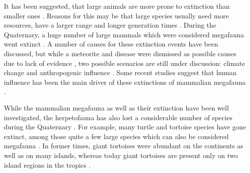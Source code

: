 It has been suggested, that large animals are more prone to extinction than smaller ones \citep{.}. Reasons for this may be that large species usually need more resources, have a larger range and longer generation times \citep{.}. 
During the Quaternary, a huge number of large mammals which were considered megafauna went extinct \citep{.}.
A number of causes for these extinction events have been discussed, but while a meteorite and disease were dismissed as possible causes due to lack of evidence \citep{.}, two possible scenarios are still under discussion: climate change and anthropogenic influence \citep{.}.
Some recent studies suggest that human influence has been the main driver of these extinctions of mammalian megafauna \citep{Barnosky2004,Sandom2014,Gibbons2004,Schuster2000}.


While the mammalian megafauna as well as their extinction %
have been well investigated, the herpetofauna has also lost a considerable number of species during the Quaternary \citep{Blain2016}. 
For example, many turtle and tortoise species have gone extinct, among those quite a few large species which can also be considered megafauna \cite{Rhodin2015,Froyd2014,Pedrono2013}.
In former times, giant tortoises were abundant on the continents as well as on many islands, whereas today giant tortoises are present only on two island regions in the tropics \citep{.}
.




